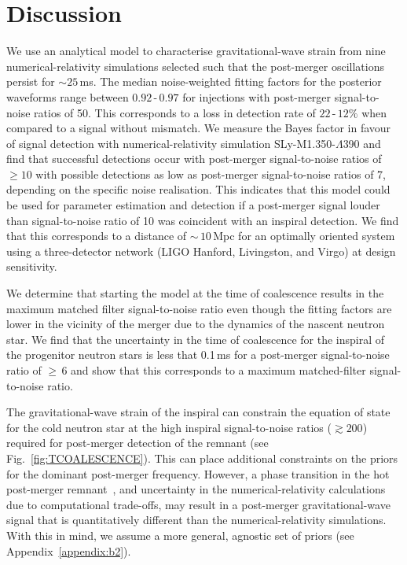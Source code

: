 \documentclass[../Thesis.tex]{subfiles}
\begin{document}
\section{Discussion}
    We use an analytical model to characterise gravitational-wave strain from nine numerical-relativity simulations selected such that the post-merger oscillations persist for $\sim 25$\,ms. 
    The median noise-weighted fitting factors for the posterior waveforms range between $0.92\,$\nobreakdash-$\,0.97$ for injections with post-merger signal-to-noise ratios of 50. 
    This corresponds to a loss in detection rate of  $22\,$\nobreakdash-$\,12\%$ when compared to a signal without mismatch.
    We measure the Bayes factor in favour of signal detection with numerical-relativity simulation SLy-M1.350-$\Lambda$390 and find that successful detections occur with post-merger signal-to-noise ratios of $\ge 10$ with possible detections as low as  post-merger signal-to-noise ratios of 7, depending on the specific noise realisation. 
    This indicates that this model could be used for parameter estimation and detection if a post-merger signal louder than signal-to-noise ratio of 10 was  coincident with an inspiral detection. 
    We find that this corresponds to a distance of $\sim\,10$\,Mpc for an optimally oriented system using a three-detector network (LIGO Hanford, Livingston, and Virgo) at design sensitivity.
    \par
    We determine that starting the model at the time of coalescence results in the maximum matched filter signal-to-noise ratio even though the fitting factors are lower in the vicinity of the merger due to the dynamics of the nascent neutron star.
    We find that the uncertainty in the time of coalescence for the inspiral of the progenitor neutron stars is less that 0.1\,ms for a post-merger signal-to-noise ratio of $\ge\,6$ and show that this corresponds to a maximum matched-filter signal-to-noise ratio. \par

    The gravitational-wave strain of the inspiral can constrain the equation of state for the cold neutron star at the high inspiral signal-to-noise ratios ($\gtrsim 200$) required for post-merger detection of the remnant (see Fig.~\ref{fig:TCOALESCENCE}). 
    This can place additional constraints on the priors for the dominant post-merger frequency. 
    However, a phase transition in the hot post-merger remnant~\cite{Most2018b,Most2018,Bauswein2019}, and uncertainty in the numerical-relativity calculations due to computational trade-offs, may result in a post-merger gravitational-wave signal that is quantitatively different than the  numerical-relativity simulations.
    With this in mind, we assume a more general, agnostic set of priors (see Appendix~\ref{appendix:b2}).
    \par
 
\end{document}
